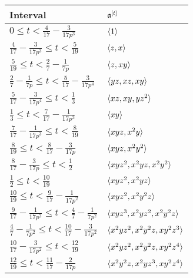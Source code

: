 \documentclass{amsart}
\begin{document}
\begin{example}
\begin{table}
   \begin{center} 
      \begingroup
      \setlength{\tabcolsep}{8pt} %
      \renewcommand{\arraystretch}{1.4} %
      \begin{tabular}{ll}
        \toprule
        Interval & $\mathfrak{a}^{[t]}$\\
        \midrule
        $0 \le t < \frac{4}{17} - \frac{3}{17 p^3}$ & $\langle 1 \rangle$ \\
        $\frac{4}{17} - \frac{3}{17 p^3} \le t < \frac5{19}$ & $\langle z, x \rangle$ \\
        $\frac5{19} \le t < \frac27 - \frac1{7 p}$ & $\langle z, xy \rangle$ \\
        $\frac27 - \frac1{7 p} \le t < \frac5{17} - \frac3{17 p^4}$ & $\langle yz, xz, xy \rangle$ \\
        $\frac5{17} - \frac3{17 p^4} \le t < \frac13$ & $\langle xz, xy, yz^2 \rangle$ \\
        $\frac13 \le t < \frac7{17} - \frac1{17 p^3}$ & $\langle xy \rangle$ \\
        $\frac7{17} - \frac1{17 p^3} \le t < \frac8{19}$ & $\langle xyz, x^2y \rangle$ \\
        $\frac8{19} \le t < \frac8{17} - \frac3{17 p}$ & $\langle xyz, x^2y^2 \rangle$ \\
        $\frac8{17} - \frac3{17 p} \le t < \frac12$ & $\langle xyz^2, x^2yz, x^2y^2 \rangle$ \\
        $\frac12 \le t < \frac{10}{19}$ & $\langle xyz^2, x^2yz \rangle$ \\
        $\frac{10}{19} \le t < \frac9{17} - \frac1{17 p^2}$ & $\langle xyz^2, x^2y^2z \rangle$ \\
        $\frac9{17} - \frac1{17 p^2} \le t < \frac47 - \frac1{7 p^2}$ & $\langle xyz^3, x^2yz^2, x^2y^2z \rangle$ \\
        $\frac47 - \frac1{7 p^2} \le t < \frac{10}{17} - \frac3{17 p^2}$ & $\langle x^2yz^2, x^2y^2z, xy^2z^3 \rangle$ \\
        $\frac{10}{17} - \frac3{17 p^2} \le t < \frac{12}{19}$ & $\langle x^2yz^2, x^2y^2z, xy^2z^4 \rangle$ \\
        $\frac{12}{19} \le t < \frac{11}{17} - \frac2{17 p}$ & $\langle x^2y^2z, x^2yz^3, xy^2z^4 \rangle$ \\

\end{tabular}
\end{center}
\end{table}
\end{example}
\end{document}
